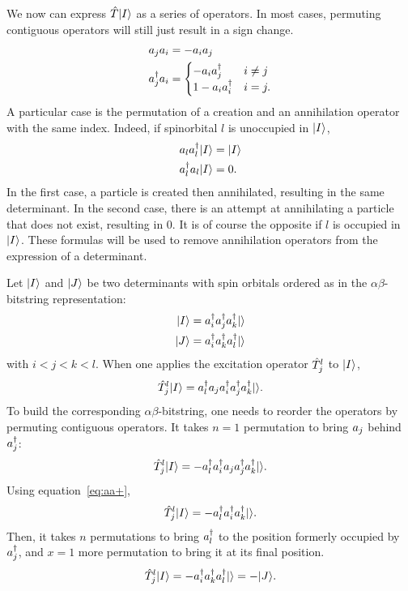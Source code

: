 \documentclass[./thesis.tex]{subfiles}
\begin{document}
We now can express $\hat T {\ket{I}}$ as a series of operators.
In most cases, permuting contiguous operators will still just result in a sign change.
\begin{align}
a_{j} a_{i} & = -a_{i} a_{j} \\
a^\dagger_{j} a_{i} & =
  \begin{cases}
  -a_{i} a^\dagger_{j} & i \ne j \\
  1 - a_{i} a^\dagger_{i} & i = j.
  \end{cases}
\end{align}
A particular case is the permutation of a creation and an annihilation operator with the same index.
Indeed, if spinorbital $l$ is unoccupied in ${\ket{I}}$,
\begin{align}
\label{eq:aa+}
a_{l} a^\dagger_{l} {\ket{I}} & = {\ket{I}}  \\
a^\dagger_{l} a_{l} {\ket{I}} & = 0 .
\end{align}
In the first case, a particle is created then annihilated, resulting in the same determinant. In the second case, there is an attempt at annihilating a particle that does not exist, resulting in $0$. It is of course the opposite if $l$ is occupied in ${\ket{I}}$.
These formulas will be used to remove annihilation operators from the expression of a determinant.



Let ${\ket{I}}$ and ${\ket{J}}$ be two determinants with spin orbitals ordered as in the $\alpha \beta$-bitstring  representation:
\begin{align}
{\ket{I}} & = a^\dagger_{i}a^\dagger_{j}a^\dagger_{k} {\ket{}} \\
{\ket{J}} & = a^\dagger_{i}a^\dagger_{k}a^\dagger_{l} {\ket{}}
\end{align}
with $i<j<k<l$.
When one applies the excitation operator ${\hat{T}_{j}^{l}}$ to ${\ket{I}}$,
\begin{equation}
{\hat{T}_{j}^{l}} {\ket{I}} = a^\dagger_{l} a_{j} a^\dagger_{i} a^\dagger_{j} a^\dagger_{k} {\ket{}}.
\end{equation}
To build the corresponding $\alpha \beta$-bitstring, one needs to
reorder the operators by permuting contiguous operators.
It takes $n=1$ permutation to bring $a_{j}$ behind $a^\dagger_{j}$:
\begin{equation}
{\hat{T}_{j}^{l}} {\ket{I}} = -a^\dagger_{l} a^\dagger_{i} a_{j} a^\dagger_{j} a^\dagger_{k} {\ket{}}.
\end{equation}
Using equation~\ref{eq:aa+},
\begin{equation}
{\hat{T}_{j}^{l}} {\ket{I}} = -a^\dagger_{l} a^\dagger_{i} a^\dagger_{k} {\ket{}}.
\end{equation}
Then, it takes $n$ permutations to bring $a^\dagger_{l}$ to the position formerly occupied by $a^\dagger_{j}$, and $x=1$ more permutation to bring it at its final position.
\begin{equation}
{\hat{T}_{j}^{l}} {\ket{I}} = -a^\dagger_{i} a^\dagger_{k} a^\dagger_{l} {\ket{}} = -{\ket{J}}.
\end{equation}
\end{document}
